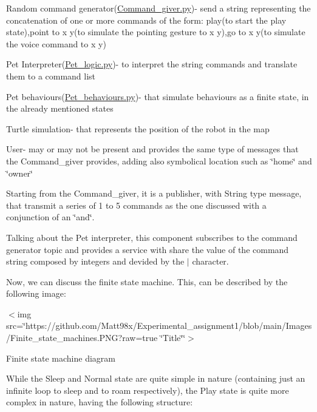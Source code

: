 \begin{DoxyItemize}
\item Random command generator(\hyperlink{Command__giver_8py}{Command\+\_\+giver.\+py})-\/ send a string representing the concatenation of one or more commands of the form\+: \textquotesingle{}play\textquotesingle{}(to start the play state),\textquotesingle{}point to x y\textquotesingle{}(to simulate the pointing gesture to x y),\textquotesingle{}go to x y\textquotesingle{}(to simulate the voice command to x y)
\item Pet Interpreter(\hyperlink{Pet__logic_8py}{Pet\+\_\+logic.\+py})-\/ to interpret the string commands and translate them to a command list
\item Pet behaviours(\hyperlink{Pet__behaviours_8py}{Pet\+\_\+behaviours.\+py})-\/ that simulate behaviours as a finite state, in the already mentioned states
\item Turtle simulation-\/ that represents the position of the robot in the map
\item User-\/ may or may not be present and provides the same type of messages that the Command\+\_\+giver provides, adding also symbolical location such as \char`\"{}home\char`\"{} and \char`\"{}owner\char`\"{}
\end{DoxyItemize}

Starting from the Command\+\_\+giver, it is a publisher, with String type message, that transmit a series of 1 to 5 commands as the one discussed with a conjunction of an \char`\"{}and\char`\"{}.

Talking about the Pet interpreter, this component subscribes to the command generator topic and provides a service with share the value of the command string composed by integers and devided by the \textquotesingle{}$\vert$\textquotesingle{} character.

Now, we can discuss the finite state machine. This, can be described by the following image\+:

$<$img src=\char`\"{}https\+://github.\+com/\+Matt98x/\+Experimental\+\_\+assignment1/blob/main/\+Images/\+Finite\+\_\+state\+\_\+machines.\+P\+N\+G?raw=true \char`\"{}Title\char`\"{}\char`\"{}$>$ 

Finite state machine diagram 

While the \textquotesingle{}Sleep\textquotesingle{} and \textquotesingle{}Normal\textquotesingle{} state are quite simple in nature (containing just an infinite loop to sleep and to roam respectively), the \textquotesingle{}Play\textquotesingle{} state is quite more complex in nature, having the following structure\+: 

